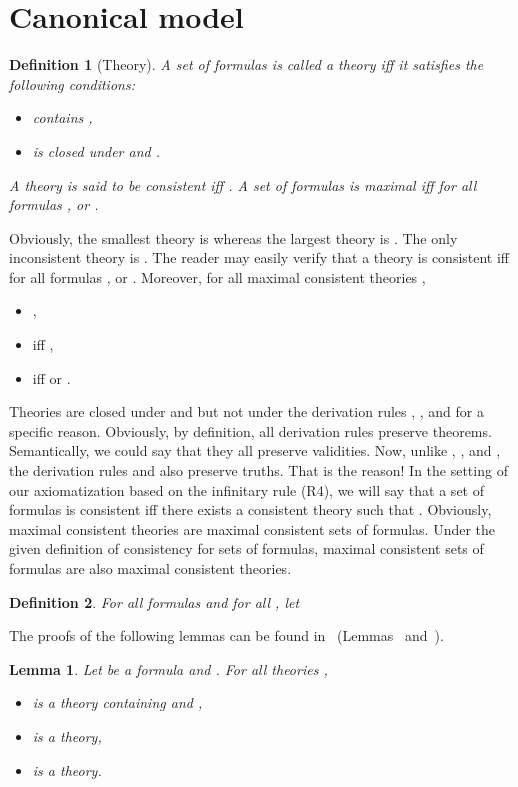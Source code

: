 \documentclass{article}[12pt]
\newtheorem{lemma}{Lemma}
\newtheorem{definition}{Definition}
\begin{document}
\section{Canonical model}
\begin{definition}[Theory]
A set  of formulas is called a theory iff it satisfies the following conditions:
\begin{itemize}
\item  contains ,
\item  is closed under  and .
\end{itemize}
A theory  is said to be {\em consistent} iff .
A set  of formulas is {\em maximal} iff for all formulas ,  or . 
\end{definition}
Obviously, the smallest theory is  whereas the largest theory is .
The only inconsistent theory is .
The reader may easily verify that a theory  is consistent iff for all formulas ,  or .
Moreover, for all maximal consistent theories ,
\begin{itemize}
\item ,
\item  iff ,
\item  iff  or .
\end{itemize}
Theories are closed under  and  but not under the derivation rules , , and  for a specific reason. Obviously, by definition, all derivation rules preserve theorems. Semantically, we could say that they all preserve validities. Now, unlike , , and , the derivation rules  and  also preserve truths. That is the reason!
In the setting of our axiomatization based on the infinitary rule (R4), we will say that a set  of formulas is consistent iff there exists a consistent theory  such that .
Obviously, maximal consistent theories are maximal consistent sets of formulas. Under the given definition of consistency for sets of formulas, maximal consistent sets of formulas are also maximal consistent theories.
\begin{definition}
For all formulas  and for all , let 
\end{definition}
The proofs of the following lemmas can be found in~\cite{balbianietal:2008} (Lemmas~ and~).
\begin{lemma}\label{lem_7}
Let  be a formula and .
For all theories ,
\begin{itemize}
\item  is a theory containing  and ,
\item  is a theory,
\item  is a theory.
\end{itemize}
\end{lemma}
\end{document}
